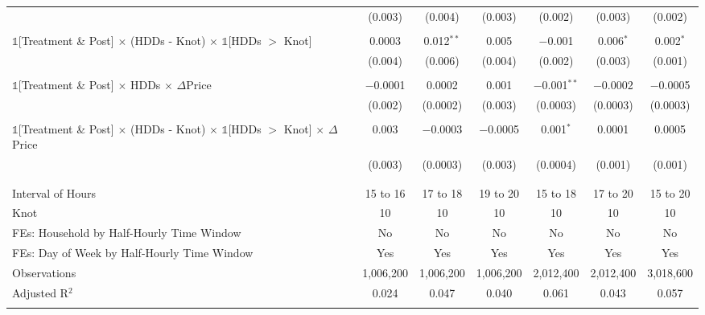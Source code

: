 \begin{table}[!htbp]
\begin{longtable}{@{\extracolsep{15pt}}lcccccc}
  & (0.003) & (0.004) & (0.003) & (0.002) & (0.003) & (0.002) \\ 
  & & & & & & \\ 
 $\mathbb{1}$[Treatment \& Post] $\times$ (HDDs - Knot) $\times$ $\mathbb{1}$[HDDs $>$ Knot] & 0.0003 & 0.012$^{**}$ & 0.005 & $-$0.001 & 0.006$^{*}$ & 0.002$^{*}$ \\ 
  & (0.004) & (0.006) & (0.004) & (0.002) & (0.003) & (0.001) \\ 
  & & & & & & \\ 
 $\mathbb{1}$[Treatment \& Post] $\times$ HDDs $\times$ $\Delta$Price & $-$0.0001 & 0.0002 & 0.001 & $-$0.001$^{**}$ & $-$0.0002 & $-$0.0005 \\ 
  & (0.002) & (0.0002) & (0.003) & (0.0003) & (0.0003) & (0.0003) \\ 
  & & & & & & \\ 
 $\mathbb{1}$[Treatment \& Post] $\times$ (HDDs - Knot) $\times$ $\mathbb{1}$[HDDs $>$ Knot] $\times$ $\Delta$Price & 0.003 & $-$0.0003 & $-$0.0005 & 0.001$^{*}$ & 0.0001 & 0.0005 \\ 
  & (0.003) & (0.0003) & (0.003) & (0.0004) & (0.001) & (0.001) \\ 
  & & & & & & \\ 
\hline \\[-1.8ex] 
Interval of Hours & 15 to 16 & 17 to 18 & 19 to 20 & 15 to 18 & 17 to 20 & 15 to 20 \\ 
Knot & 10 & 10 & 10 & 10 & 10 & 10 \\ 
FEs: Household by Half-Hourly Time Window & No & No & No & No & No & No \\ 
FEs: Day of Week by Half-Hourly Time Window & Yes & Yes & Yes & Yes & Yes & Yes \\ 
Observations & 1,006,200 & 1,006,200 & 1,006,200 & 2,012,400 & 2,012,400 & 3,018,600 \\ 
Adjusted R$^{2}$ & 0.024 & 0.047 & 0.040 & 0.061 & 0.043 & 0.057 \\ 
\hline 
\hline \\[-1.8ex] 
\end{longtable} 
\end{table} 

